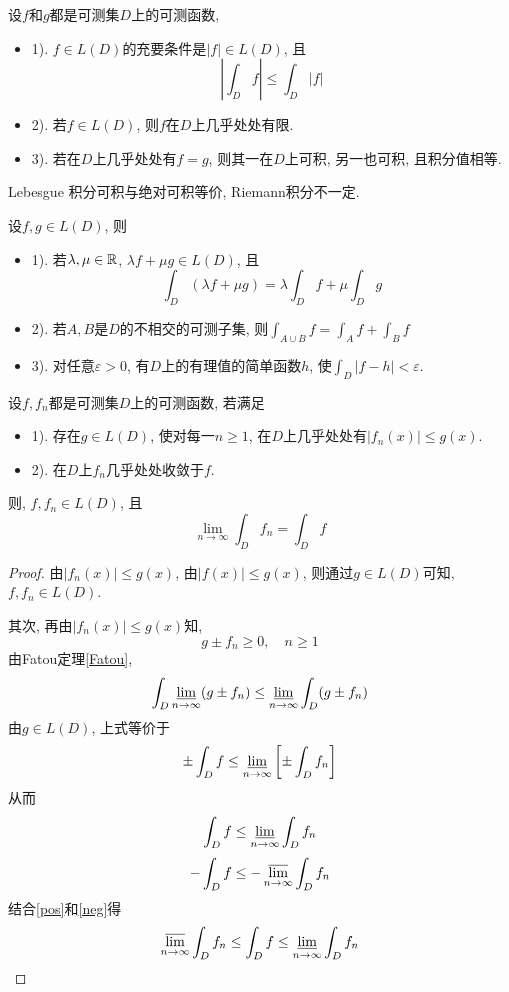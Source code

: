 \documentclass[12pt, a4paper, oneside, UTF8]{ctexbook}  %
\begin{document}
\begin{thm}
    设$f$和$g$都是可测集$D$上的可测函数, 
    \begin{itemize}
        \item 1). $f\in L(D)$的充要条件是$|f|\in L(D)$, 且$$ \left| \int_{D}f \right| \leq\int_{D}|f| $$
        \item 2). 若$f\in L(D)$, 则$f$在$D$上几乎处处有限.
        \item 3). 若在$D$上几乎处处有$f=g$, 则其一在$D$上可积, 另一也可积, 且积分值相等.
    \end{itemize}
\end{thm}

\begin{rmk}
    Lebesgue 积分可积与绝对可积等价, Riemann积分不一定.
\end{rmk}


\begin{thm}
    设$f,g\in L(D)$, 则
    \begin{itemize}
        \item 1). 若$\lambda, \mu \in \mathbb{R}$, $\lambda f + \mu g\in L(D)$, 且
        $$\int _{D}(\lambda f + \mu g)=\lambda\int _{D}f+\mu\int _{D}g$$
        \item 2). 若$A, B$是$D$的不相交的可测子集, 则$\int _{A\cup B}f=\int_{A}f+\int_{B}f$
        \item 3). 对任意$\varepsilon>0$, 有$D$上的有理值的简单函数$h$, 使$\int_{D}|f-h|<\varepsilon$.
    \end{itemize}
\end{thm}

\begin{thm}[控制收敛定理]\label{control}
    设$f,f_n$都是可测集$D$上的可测函数, 若满足
    \begin{itemize}
        \item 1). 存在$g\in L(D)$, 使对每一$n\geq 1$, 在$D$上几乎处处有$|f_n(x)|\leq g(x)$.
        \item 2). 在$D$上$f_n$几乎处处收敛于$f$.
    \end{itemize}
    则, $f, f_n\in L(D)$, 且$$ \lim_{n\to\infty}\int_{D}f_n=\int_{D}f $$
\end{thm}

\begin{proof}
    由$|f_n(x)|\leq g(x)$, 由$|f(x)|\leq g(x)$, 则通过$g\in L(D)$可知, $f, f_n\in L(D)$.
    \par 其次, 再由$|f_n(x)|\leq g(x)$知, $$ g\pm f_n \geq 0 , \quad n\geq 1$$
    由Fatou定理\ref{Fatou}, $$ \int_{D}\varliminf_{n\to\infty}(g\pm f_n)\leq 
    \varliminf_{n\to\infty}\int_{D}(g\pm f_n) $$
    由$g\in L(D)$, 上式等价于$$ \pm\int_{D}f\leq \varliminf_{n\to\infty}\left[\pm\int_{D}f_n\right]$$
    从而
    \begin{equation}\label{pos}
        \int_{D}f \leq \varliminf_{n\to\infty}\int_{D}f_n
    \end{equation}
    \begin{equation}\label{neg}
        -\int_{D}f \leq -\varlimsup_{n\to\infty}\int_{D}f_n
    \end{equation}
    结合\ref{pos}和\ref{neg}得$$ \varlimsup_{n\to\infty}\int_{D}f_n \leq \int_{D}f \leq \varliminf_{n\to\infty}\int_{D}f_n$$
\end{proof}
\end{document}

